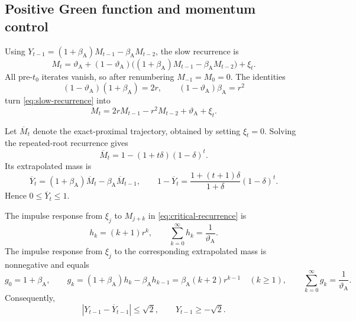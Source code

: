 \documentclass[11pt]{article}
\begin{document}
\subsection{Positive Green function and momentum control}

Using $Y_{t-1}=(1+\beta_{\mathrm A})M_{t-1}-\beta_{\mathrm A} M_{t-2}$, the slow recurrence is
\begin{equation}
  M_t
  =\vartheta_{\mathrm A}+(1-\vartheta_{\mathrm A})\bigl((1+\beta_{\mathrm A})M_{t-1}-\beta_{\mathrm A} M_{t-2}\bigr)+\xi_t.
  \label{eq:slow-recurrence}
\end{equation}
All pre-$t_0$ iterates vanish, so after renumbering
$M_{-1}=M_0=0$.  The identities
\begin{equation}
  (1-\vartheta_{\mathrm A})(1+\beta_{\mathrm A})=2r,
  \qquad
  (1-\vartheta_{\mathrm A})\beta_{\mathrm A}=r^2
  \label{eq:critical-identities}
\end{equation}
turn \cref{eq:slow-recurrence} into
\begin{equation}
  M_t=2rM_{t-1}-r^2M_{t-2}+\vartheta_{\mathrm A}+\xi_t.
  \label{eq:critical-recurrence}
\end{equation}

Let $\overline M_t$ denote the exact-proximal trajectory, obtained by setting
$\xi_t=0$.  Solving the repeated-root recurrence gives
\begin{equation}
  \overline M_t
  =1-(1+t\delta)(1-\delta)^t.
  \label{eq:exact-trajectory}
\end{equation}
Its extrapolated mass is
\begin{equation}
  \overline Y_t
  =(1+\beta_{\mathrm A})\overline M_t-\beta_{\mathrm A}\overline M_{t-1},
  \qquad
  1-\overline Y_t
  =\frac{1+(t+1)\delta}{1+\delta}(1-\delta)^t.
  \label{eq:exact-Y}
\end{equation}
Hence $0\leq\overline Y_t\leq1$.

\begin{lemma}
\label{lem:green}
The impulse response from $\xi_j$ to $M_{j+k}$ in
\cref{eq:critical-recurrence} is
\begin{equation}
  h_k=(k+1)r^k,
  \qquad
  \sum_{k=0}^\infty h_k=\frac1{\vartheta_{\mathrm A}}.
  \label{eq:h-green}
\end{equation}
The impulse response from $\xi_j$ to the corresponding extrapolated mass is
nonnegative and equals
\begin{equation}
  g_0=1+\beta_{\mathrm A},
  \qquad
  g_k=(1+\beta_{\mathrm A})h_k-\beta_{\mathrm A} h_{k-1}
     =\beta_{\mathrm A}(k+2)r^{k-1}\quad(k\geq1),
  \qquad
  \sum_{k=0}^\infty g_k=\frac1{\vartheta_{\mathrm A}}.
  \label{eq:g-green}
\end{equation}
Consequently,
\begin{equation}
  |Y_{t-1}-\overline Y_{t-1}|\leq\sqrt2,
  \qquad
  Y_{t-1}\geq-\sqrt2.
  \label{eq:Y-lower}
\end{equation}
\end{lemma}
\end{document}
